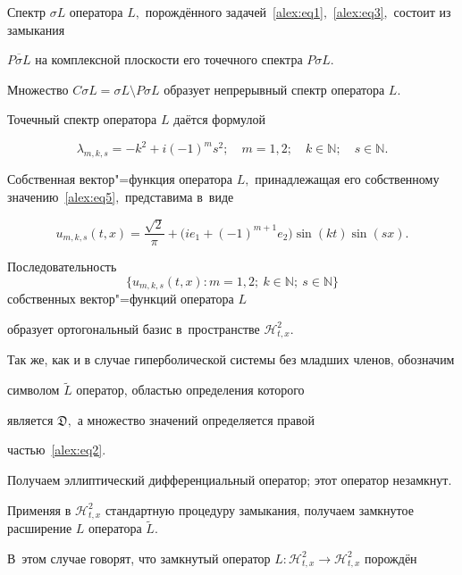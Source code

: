 \begin{theorem}[1]Спектр $\sigma{L}$ оператора $L,$ порождённого задачей~\eqref{alex:eq1}$,$ \eqref{alex:eq3}$,$ состоит из замыкания

$\overline{P\sigma{L}}$ на комплексной плоскости его точечного спектра $P\sigma{L}.$ 

Множество $C\sigma{L}=\sigma{L}\setminus{P\sigma{L}}$ образует непрерывный спектр оператора $L.$ 

Точечный спектр оператора ${L}$ даётся формулой

\begin{equation}\label{alex:eq5}

\lambda_{m,k,s}=-k^2+i(-1)^ms^2; \quad m=1, 2; \quad k\in\mathbb{N};\quad s\in\mathbb{N}.

\end{equation}

Собственная вектор"=функция оператора ${L},$ принадлежащая его собственному значению~\eqref{alex:eq5}$,$ представима в~виде

$$

u_{m,k,s}(t,x)=\frac{\sqrt{2}}{\pi}+\bigl(ie_1+(-1)^{m+1}e_2\bigr)\sin(kt)\sin(sx).

$$

Последовательность $$\{u_{m,k,s}(t,x): m=1, 2; ~k\in\mathbb{N}; ~s\in\mathbb{N}\}$$ собственных вектор"=функций оператора $L$

образует ортогональный базис в~пространстве $\mathcal{H}^2_{t,x}.$

\end{theorem}



\smallskip




Так же, как и в случае гиперболической системы без младших членов, обозначим

символом $\widetilde{L}$ оператор, областью определения которого

является $\mathfrak{D},$ а множество значений определяется правой

частью~\eqref{alex:eq2}. 

Получаем  эллиптический дифференциальный оператор; этот оператор незамкнут. 

Применяя в $\mathcal{H}^2_{t,x}$ стандартную процедуру замыкания, получаем замкнутое расширение $L$ оператора $\widetilde{L}$. 

В~этом случае говорят, что замкнутый оператор $L:\mathcal{H}^2_{t,x}\to\mathcal{H}^2_{t,x}$ порождён

